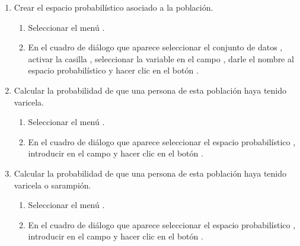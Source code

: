 \begin{enumerate}[leftmargin=*]
\begin{enumerate}
\item Crear el espacio probabilístico asociado a la población.
\begin{indicacion}
\begin{enumerate}
\item Seleccionar el menú .
\item En el cuadro de diálogo que aparece seleccionar el conjunto de datos , activar la casilla
, seleccionar la variable  en el campo , darle el nombre
 al espacio probabilístico y hacer clic en el botón .
\end{enumerate}
\end{indicacion}  

\item Calcular la probabilidad de que una persona de esta población haya tenido varicela. 
\begin{indicacion}
\begin{enumerate}
\item Seleccionar el menú .
\item En el cuadro de diálogo que aparece seleccionar el espacio probabilístico , introducir
 en el campo  y hacer clic en el botón .
\end{enumerate}
\end{indicacion} 

\item Calcular la probabilidad de que una persona de esta población haya tenido varicela o sarampión. 
\begin{indicacion}
\begin{enumerate}
\item Seleccionar el menú .
\item En el cuadro de diálogo que aparece seleccionar el espacio probabilístico , introducir
 en el campo  y hacer clic en el botón .
\end{enumerate}
\end{indicacion} 


\end{enumerate}
\end{enumerate}
